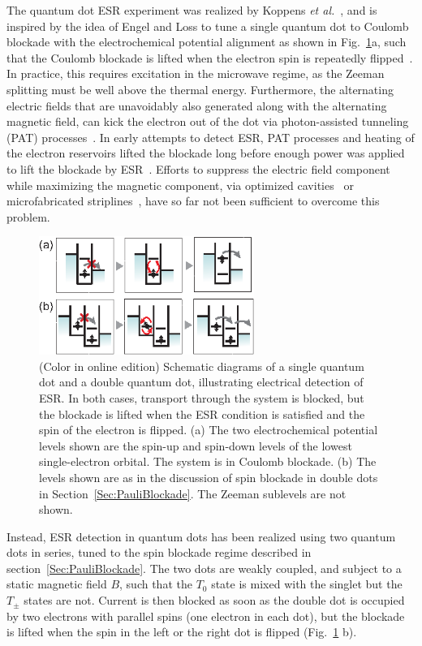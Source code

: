 \documentclass[rmp,twocolumn,aps]{revtex4}
\begin{document}
The quantum dot ESR experiment was realized by Koppens \textit{et al.}~\cite{koppens06}, and is inspired by the idea of Engel and Loss to tune a single quantum dot to Coulomb blockade with the electrochemical potential alignment as
shown in Fig.~\ref{fig:ESR_detection}a, such that the Coulomb
blockade is lifted when the electron spin is repeatedly flipped~\cite{engel01,engel02}.
In practice, this requires excitation in the microwave regime, as
the Zeeman splitting must be well above the thermal energy.
Furthermore, the alternating electric fields that are unavoidably
also generated along with the alternating magnetic field, can kick
the electron out of the dot via photon-assisted tunneling (PAT)
processes~\cite{platero04}. In early attempts to detect ESR, PAT
processes and heating of the electron reservoirs lifted the
blockade long before enough power was applied to lift the blockade
by ESR~\cite{HansonThesis2005}. Efforts to suppress the electric
field component while maximizing the magnetic component, via
optimized cavities~\cite{simovic06} or microfabricated
striplines~\cite{koppens06}, have so far not been sufficient to
overcome this problem.

\begin{figure}[htb]
\includegraphics[width=7cm]{hanson_fig42.eps}
\caption{(Color in online edition) Schematic diagrams of a single quantum dot and a double
quantum dot, illustrating electrical detection of ESR. In both
cases, transport through the system is blocked, but the blockade
is lifted when the ESR condition is satisfied and the spin of the
electron is flipped. (a) The two electrochemical potential levels
shown are the spin-up and spin-down levels of the lowest
single-electron orbital. The system is in Coulomb blockade. (b)
The levels shown are as in the discussion of spin blockade in
double dots in Section~\ref{Sec:PauliBlockade}. The Zeeman
sublevels are not shown.} \label{fig:ESR_detection}
\end{figure}

Instead, ESR detection in quantum dots has been realized using two
quantum dots in series, tuned to the spin blockade regime described in
section~\ref{Sec:PauliBlockade}. The two dots are weakly coupled,
and subject to a static magnetic field $B$, such that the $T_{0}$
state is mixed with the singlet but the $T_{\pm}$ states are not.
Current is then blocked as soon as the double dot is occupied by
two electrons with parallel spins (one electron in each dot), but
the blockade is lifted when the spin in the left or the right dot
is flipped (Fig.~\ref{fig:ESR_detection} b).
\end{document}
